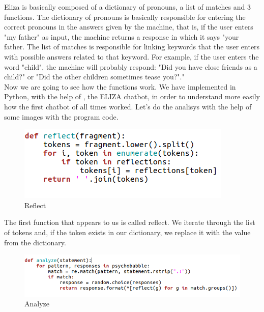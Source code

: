 \documentclass[12pt,twoside]{article}
\theoremstyle{plain}
\theoremstyle{definition}
\theoremstyle{remark}
\begin{document}
Eliza is basically composed of a dictionary of pronouns, a list of matches and 3 functions.\cite{joseph1966eliza} The dictionary of pronouns is basically responsible for entering the correct pronouns in the answers given by the machine, that is, if the user enters "my father" as input, the machine returns a response in which it says "your father. The list of matches is responsible for linking keywords that the user enters with possible answers related to that keyword. For example, if the user enters the word "child", the machine will probably respond: "Did you have close friends as a child?" or "Did the other children sometimes tease you?"."\cite{joseph1966eliza}\\

Now we are going to see how the functions work. We have implemented in Python, with the help of \cite{small2017}, the ELIZA chatbot, in order to understand more easily how the first chatbot of all times worked. Let's do the analisys with the help of some images with the program code.\\

\begin{figure}[h]
\centering
\includegraphics[scale=0.6]{./Pictures/reflect.png}
\caption{Reflect} 
\end{figure}

The first function that appears to us is called reflect. We iterate through the list of tokens and, if the token exists in our dictionary, we replace it with the value from the dictionary.

\begin{figure}[h]
\centering
\includegraphics[scale=0.6]{./Pictures/analyze.png}
\caption{Analyze}
\label{fig:analyze}
\end{figure}
\end{document}
